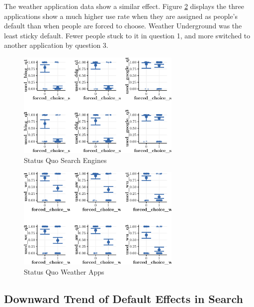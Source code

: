 \documentclass[
  11pt,
]{article}
\begin{document}
The weather application data show a similar effect. Figure \ref{fig:Sqweather} displays the three applications show a much higher use rate when they are assigned as people's default than when people are forced to choose. Weather Underground was the least sticky default. Fewer people stuck to it in question 1, and more switched to another application by question 3.

\begin{figure}

{\centering \includegraphics[width=0.7\textwidth]{Results-July19-307_files/figure-latex/Sqsearch-1} 

}

\caption{Status Quo Search Engines}\label{fig:Sqsearch}
\end{figure}

\begin{figure}

{\centering \includegraphics[width=0.7\textwidth]{Results-July19-307_files/figure-latex/Sqweather-1} 

}

\caption{Status Quo Weather Apps}\label{fig:Sqweather}
\end{figure}

\hypertarget{downward-trend-of-default-effects-in-search}{%
\subsection{Downward Trend of Default Effects in Search}\label{downward-trend-of-default-effects-in-search}}
\end{document}
